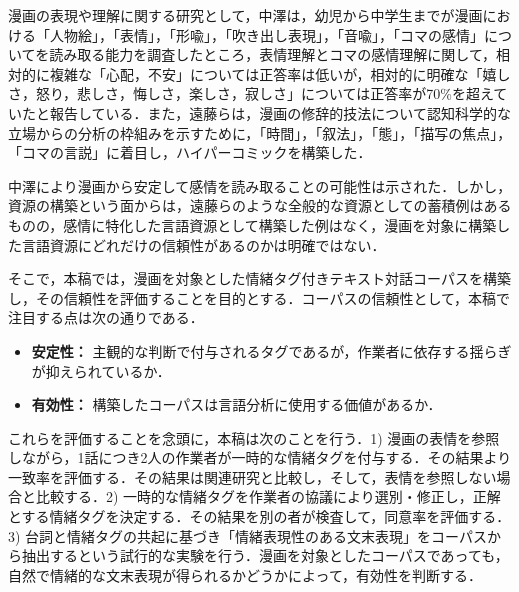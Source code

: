 \documentclass[japanese]{jnlp_1.3c}
\begin{document}
漫画の表現や理解に関する研究として，中澤は，幼児から中学生までが漫画における「人物絵」，「表情」，「形喩」，「吹き出し表現」，「音喩」，「コマの感情」についてを読み取る能力を調査したところ，表情理解とコマの感情理解に関して，相対的に複雑な「心配，不安」については正答率は低いが，相対的に明確な「嬉しさ，怒り，悲しさ，悔しさ，楽しさ，寂しさ」については正答率が70\%を超えていたと報告している\cite{中澤05}．また，遠藤らは，漫画の修辞的技法について認知科学的な立場からの分析の枠組みを示すために，「時間」，「叙法」，「態」，「描写の焦点」，「コマの言説」に着目し，ハイパーコミックを構築した\cite{遠藤&小方03}．

中澤により漫画から安定して感情を読み取ることの可能性は示された．しかし，資源の構築という面からは，遠藤らのような全般的な資源としての蓄積例はあるものの，感情に特化した言語資源として構築した例はなく，漫画を対象に構築した言語資源にどれだけの信頼性があるのかは明確ではない．

そこで，本稿では，漫画を対象とした情緒タグ付きテキスト対話コーパスを構築し，その信頼性を評価することを目的とする．コーパスの信頼性として，本稿で注目する点は次の通りである．
\begin{itemize}
\item {\bf 安定性：} 主観的な判断で付与されるタグであるが，作業者に依存する揺らぎが抑えられているか．

\item {\bf 有効性：} 構築したコーパスは言語分析に使用する価値があるか．
\end{itemize}

これらを評価することを念頭に，本稿は次のことを行う．1) 漫画の表情を参照しながら，1話につき2人の作業者が一時的な情緒タグを付与する．その結果より一致率を評価する．その結果は関連研究と比較し，そして，表情を参照しない場合と比較する．2) 一時的な情緒タグを作業者の協議により選別・修正し，正解とする情緒タグを決定する．その結果を別の者が検査して，同意率を評価する．3) 台詞と情緒タグの共起に基づき「情緒表現性のある文末表現」をコーパスから抽出するという試行的な実験を行う．漫画を対象としたコーパスであっても，自然で情緒的な文末表現が得られるかどうかによって，有効性を判断する．
\end{document}

